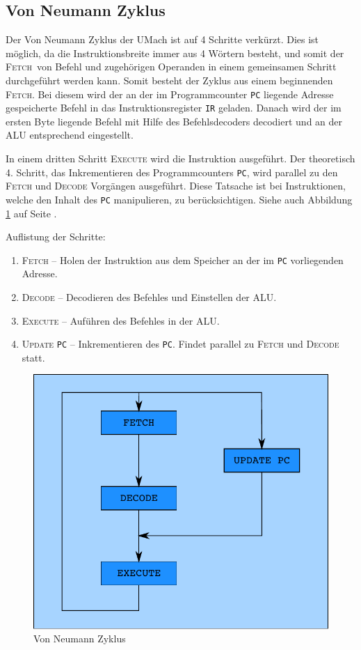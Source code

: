 \subsection[Neumann Zyklus]{Von Neumann Zyklus}
\label{subsec:Neumann-Zyklus}

Der Von Neumann Zyklus der UMach ist auf 4 Schritte verkürzt. Dies ist möglich,
da die Instruktionsbreite immer aus 4 Wörtern besteht, und somit der 
\glqq\textsc{Fetch}\grqq\ von 
Befehl und zugehörigen Operanden in einem gemeinsamen Schritt durchgeführt
werden kann. Somit besteht der Zyklus aus einem beginnenden \textsc{Fetch}. Bei
diesem wird der an der im Programmcounter \texttt{PC} liegende Adresse
gespeicherte Befehl in das Instruktionsregister \texttt{IR} geladen. Danach
wird der im ersten Byte liegende Befehl mit Hilfe des Befehlsdecoders decodiert
und an der \textsc{ALU} entsprechend eingestellt. 

In einem dritten Schritt \textsc{Execute} wird die Instruktion ausgeführt. Der
theoretisch 4. Schritt, das Inkrementieren des Programmcounters \texttt{PC},
wird parallel zu den \textsc{Fetch} und \textsc{Decode} Vorgängen ausgeführt.
Diese Tatsache ist bei Instruktionen, welche den Inhalt des \texttt{PC}
manipulieren, zu berücksichtigen. Siehe auch Abbildung \ref{fig:Neumann-Zyklus}
auf Seite \pageref{fig:Neumann-Zyklus}.

Auflistung der Schritte:

\begin{enumerate}
 \item \textsc{Fetch} --
       Holen der Instruktion aus dem Speicher an der im \texttt{PC} vorliegenden Adresse.
 \item \textsc{Decode} --
       Decodieren des Befehles und Einstellen der \textsc{ALU}.
 \item \textsc{Execute} --
       Auführen des Befehles in der \textsc{ALU}.
 \item \textsc{Update} \texttt{PC} --
       Inkrementieren des \texttt{PC}. Findet parallel zu \textsc{Fetch} und
       \textsc{Decode} statt.
\end{enumerate}

\begin{figure}[h!tp]
 \centering
 \includegraphics{./img/zyklus.pdf}
 \caption{Von Neumann Zyklus }
 \label{fig:Neumann-Zyklus}
\end{figure}

